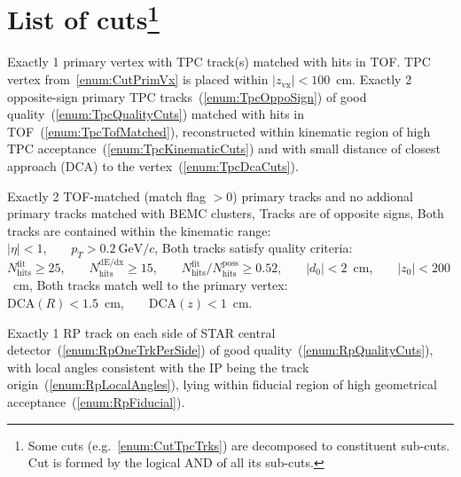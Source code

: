 \section[List of cuts]{List of cuts\footnote{Some cuts (e.g.~\ref{enum:CutTpcTrks}) are decomposed to constituent sub-cuts. Cut is formed by the logical AND of all its sub-cuts.}}\label{sec:listOfCuts}
\begin{enumerate}[label=\textbf{C\arabic*},ref=C\arabic*]
 \itemm Exactly 1 primary vertex with TPC track(s) matched with hits in TOF.\label{enum:CutPrimVx}
 \itemm TPC vertex from~\ref{enum:CutPrimVx} is placed within $|z_{\textrm{vx}}|<100$~cm.\label{enum:CutZVx}
 \itemm Exactly 2 opposite-sign primary TPC tracks~(\ref{enum:TpcOppoSign}) of good quality~(\ref{enum:TpcQualityCuts}) matched with hits in TOF~(\ref{enum:TpcTofMatched}), reconstructed within kinematic region of high TPC acceptance~(\ref{enum:TpcKinematicCuts}) and with small distance of closest approach (DCA) to the vertex~(\ref{enum:TpcDcaCuts}).\label{enum:CutTpcTrks}
    \begin{enumerate}[label=\textbf{\theenumi.\arabic*},ref=\theenumi.\arabic*]
      \itemm Exactly 2 TOF-matched (match flag $>0$) primary tracks and no addional primary tracks matched with BEMC clusters,\label{enum:TpcTofMatched}
      \itemm Tracks are of opposite signs,\label{enum:TpcOppoSign}
      \itemm Both tracks are contained within the kinematic range:\label{enum:TpcKinematicCuts}\\[2pt]
      $|\eta|<1$,~~~~$p_{T}>0.2~\textrm{GeV}/c$,
      \itemm Both tracks satisfy quality criteria:\label{enum:TpcQualityCuts}\\[2pt]
      $N_{\textrm{hits}}^{\textrm{fit}}\geq25$,~~~~$N_{\textrm{hits}}^{\textrm{dE/dx}}\geq15$,~~~~$N_{\textrm{hits}}^{\textrm{fit}}/N_{\textrm{hits}}^{\textrm{poss}}\geq0.52$,~~~~$|d_{0}|<2$~cm,~~~~$|z_{0}|<200$~cm,
      \itemm Both tracks match well to the primary vertex:\label{enum:TpcDcaCuts}\\[2pt]
      $\textrm{DCA}(R)<1.5$~cm,~~~~$\textrm{DCA}(z)<1$~cm.
    \end{enumerate}
 \itemm Exactly 1 RP track on each side of STAR central detector~(\ref{enum:RpOneTrkPerSide}) of good quality~(\ref{enum:RpQualityCuts}), with local angles consistent with the IP being the track origin~(\ref{enum:RpLocalAngles}), lying within fiducial region of high geometrical acceptance~(\ref{enum:RpFiducial}).\label{enum:CutRpTrks}
      \begin{enumerate}[label=\textbf{\theenumi.\arabic*},ref=\theenumi.\arabic*]

\end{enumerate}
\end{enumerate}
